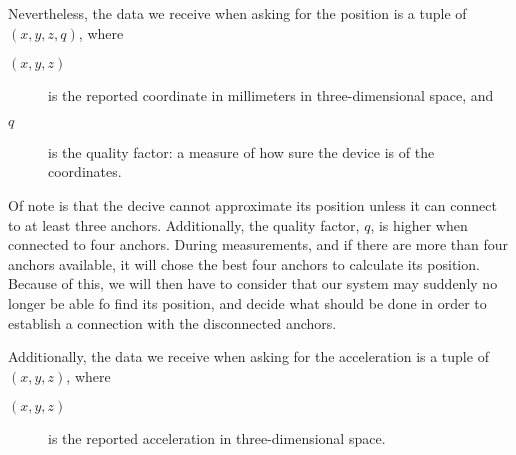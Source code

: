 Nevertheless, the data we receive when asking for the position is a tuple of
$(x, y, z, q)$, where
\begin{description}
\item[$(x, y, z)$] is the reported coordinate in millimeters in three-dimensional space, and
\item[$q$] is the quality factor: a measure of how sure the device is of the coordinates.
\end{description}

Of note is that the decive cannot approximate its position unless it can connect to at least three anchors.
Additionally, the quality factor, $q$, is higher when connected to four anchors.
During measurements, and if there are more than four anchors available, it will chose the best four anchors to calculate its position. %
Because of this, we will then have to consider that our system may suddenly no longer be able fo find its position,
and decide what should be done in order to establish a connection with the disconnected anchors.

Additionally, the data we receive when asking for the acceleration is a tuple of $(x, y, z)$, where
\begin{description}
\item[$(x, y, z)$] is the reported acceleration in three-dimensional space.
\end{description}




